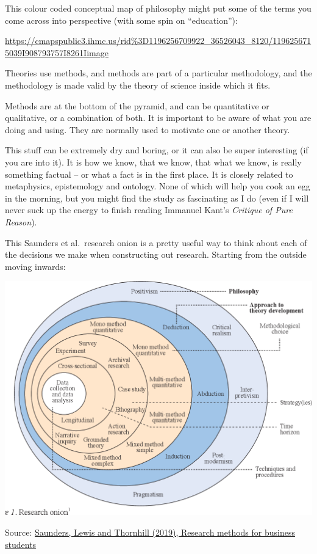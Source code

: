\documentclass[
]{book}
\begin{document}
This colour coded conceptual map of philosophy might put some of the
terms you come across into perspective (with some spin on ``education''):

\url{https://cmapspublic3.ihmc.us/rid\%3D1196256709922_36526043_8120/1196256715039I908793757I8261Iimage}

Theories use methods, and methods are part of a particular methodology,
and the methodology is made valid by the theory of science inside which
it fits.

Methods are at the bottom of the pyramid, and can be quantitative or
qualitative, or a combination of both. It is important to be aware of
what you are doing and using. They are normally used to motivate one or
another theory.

This stuff can be extremely dry and boring, or it can also be super
interesting (if you are into it). It is how we know, that we know, that
what we know, is really something factual -- or what a fact is in the
first place. It is closely related to metaphysics, epistemology and
ontology. None of which will help you cook an egg in the morning, but
you might find the study as fascinating as I do (even if I will never
suck up the energy to finish reading Immanuel Kant's \emph{Critique of Pure
Reason}).

This Saunders et al.~research onion is a pretty useful way to think
about each of the decisions we make when constructing out research.
Starting from the outside moving inwards:

\includegraphics{images/onion.png}

Source: \href{https://www.researchgate.net/profile/Mark-Saunders-10/publication/330760964_Research_Methods_for_Business_Students_Chapter_4_Understanding_research_philosophy_and_approaches_to_theory_development/links/5c53056f299bf12be3f0e2cf/Research-Methods-for-Business-Students-Chapter-4-Understanding-research-philosophy-and-approaches-to-theory-development.pdf}{Saunders, Lewis and Thornhill (2019), Research methods for
business
students}
\end{document}
